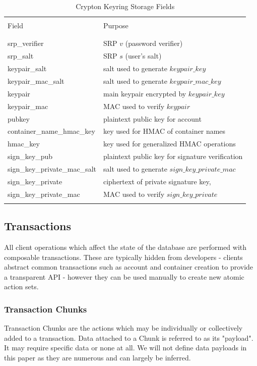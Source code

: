 \documentclass[conference]{IEEEtran}
\begin{document}
\begin{table}[ht]
\caption{Crypton Keyring Storage Fields}
\centering
\begin{tabular}{l l}
\hline\hline
\\ [0.1ex]
Field & Purpose \\
\\ [0.1ex]
\hline
\\ [0.3ex]
srp\_verifier & SRP \(v\) (password verifier) \cite{srp-protocol} \\
srp\_salt & SRP \(s\) (user's salt) \cite{srp-protocol} \\
keypair\_salt & salt used to generate \(keypair\_key\) \\
keypair\_mac\_salt & salt used to generate \(keypair\_mac\_key\) \\
keypair & main keypair encrypted by \(keypair\_key\) \\
keypair\_mac & MAC used to verify \(keypair\) \\
pubkey & plaintext public key for account \\
container\_name\_hmac\_key & key used for HMAC of container names \\
hmac\_key & key used for generalized HMAC operations \\
sign\_key\_pub & plaintext public key for signature verification \\
sign\_key\_private\_mac\_salt & salt used to generate \(sign\_key\_private\_mac\) \\
sign\_key\_private & ciphertext of private signature key, \\
sign\_key\_private\_mac & MAC used to verify \(sign\_key\_private\) \\
\\ [0.3ex]
\hline
\end{tabular}
\label{table:nonlin}
\end{table}

\subsection{Transactions}
All client operations which affect the state of the database are performed
with composable transactions. These are typically hidden from developers -
clients abstract common transactions such as account and container creation
to provide a transparent API - however they can be used manually to create
new atomic action sets.

\subsubsection{Transaction Chunks}
Transaction Chunks are the actions which may be individually or collectively
added to a transaction. Data attached to a Chunk is referred to as its "payload".
It may require specific data or none at all. We will not define data payloads
in this paper as they are numerous and can largely be inferred.
\end{document}
